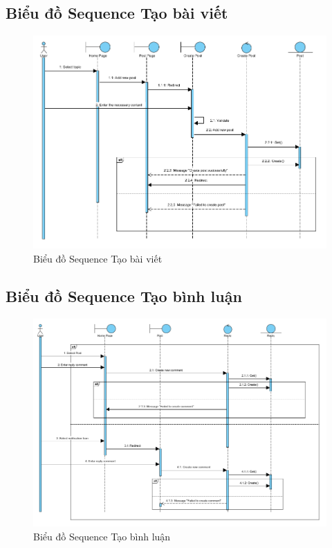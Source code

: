 \documentclass[../index.tex]{subfiles}
\begin{document}
    \subsection{Biểu đồ Sequence Tạo bài viết}
    \begin{figure}[H]
        \centering
        \includegraphics[width=0.8\linewidth]{figures/sequences/sequence-post-create.png}
        \caption{Biểu đồ Sequence Tạo bài viết}
    \end{figure}

    \subsection{Biểu đồ Sequence Tạo bình luận}
    \begin{figure}[H]
        \centering
        \includegraphics[width=0.8\linewidth]{figures/sequences/sequence-reply.png}
        \caption{Biểu đồ Sequence Tạo bình luận}
    \end{figure}
\end{document}
